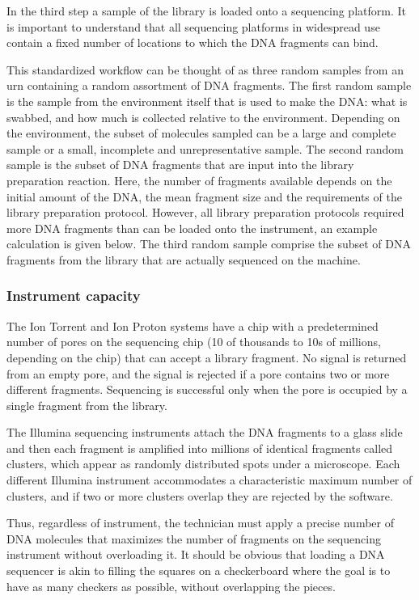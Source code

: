 \documentclass[twocolumn]{article}
\begin{document}
In the third step a sample of the library is loaded onto a sequencing
platform. It is important to understand that all sequencing platforms in
widespread use contain a fixed number of locations to which the DNA
fragments can bind.

This standardized workflow can be thought of as three random samples
from an urn containing a random assortment of DNA fragments. The first
random sample is the sample from the environment itself that is used to
make the DNA: what is swabbed, and how much is collected relative to the
environment. Depending on the environment, the subset of molecules
sampled can be a large and complete sample or a small, incomplete and
unrepresentative sample. The second random sample is the subset of DNA
fragments that are input into the library preparation reaction. Here,
the number of fragments available depends on the initial amount of the
DNA, the mean fragment size and the requirements of the library
preparation protocol. However, all library preparation protocols
required more DNA fragments than can be loaded onto the instrument, an
example calculation is given below. The third random sample comprise the
subset of DNA fragments from the library that are actually sequenced on
the machine.

\subsubsection{Instrument capacity}\label{instrument-capacity}

The Ion Torrent and Ion Proton systems have a chip with a predetermined
number of pores on the sequencing chip (10 of thousands to 10s of
millions, depending on the chip) that can accept a library fragment. No
signal is returned from an empty pore, and the signal is rejected if a
pore contains two or more different fragments. Sequencing is successful
only when the pore is occupied by a single fragment from the library.

The Illumina sequencing instruments attach the DNA fragments to a glass
slide and then each fragment is amplified into millions of identical
fragments called clusters, which appear as randomly distributed spots
under a microscope. Each different Illumina instrument accommodates a
characteristic maximum number of clusters, and if two or more clusters
overlap they are rejected by the software.

Thus, regardless of instrument, the technician must apply a precise
number of DNA molecules that maximizes the number of fragments on the
sequencing instrument without overloading it. It should be obvious that
loading a DNA sequencer is akin to filling the squares on a checkerboard
where the goal is to have as many checkers as possible, without
overlapping the pieces.
\end{document}
